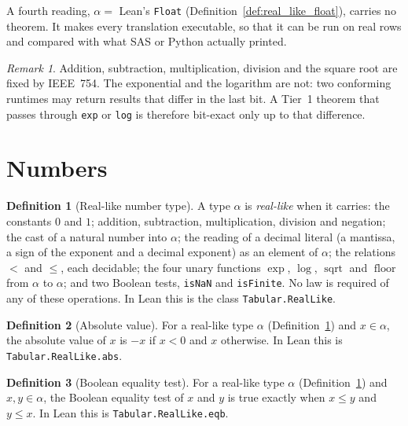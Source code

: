 \documentclass[11pt,a4paper]{article}
\theoremstyle{definition}
\newtheorem{definition}{Definition}
\theoremstyle{plain}
\theoremstyle{remark}
\newtheorem{remark}{Remark}
\newcommand{\code}[1]{\texttt{#1}}
\begin{document}
A fourth reading, $\alpha = $ Lean's \code{Float} (Definition~\ref{def:real_like_float}),
carries no theorem. It makes every translation executable, so that it can be run on real rows
and compared with what SAS or Python actually printed.

\begin{remark}\label{rem:primitives}
Addition, subtraction, multiplication, division and the square root are fixed by IEEE~754.
The exponential and the logarithm are not: two conforming runtimes may return results that
differ in the last bit. A Tier~1 theorem that passes through \code{exp} or \code{log} is
therefore bit-exact only up to that difference.
\end{remark}

\section{Numbers}

\begin{definition}[Real-like number type]\label{def:real_like}
A type $\alpha$ is \emph{real-like} when it carries: the constants $0$ and $1$; addition,
subtraction, multiplication, division and negation; the cast of a natural number into
$\alpha$; the reading of a decimal literal (a mantissa, a sign of the exponent and a decimal
exponent) as an element of $\alpha$; the relations $<$ and $\le$, each decidable; the four
unary functions $\exp$, $\log$, $\operatorname{sqrt}$ and $\operatorname{floor}$ from $\alpha$
to $\alpha$; and two Boolean tests, \code{isNaN} and \code{isFinite}. No law is required of any
of these operations. In Lean this is the class \code{Tabular.RealLike}.
\end{definition}

\begin{definition}[Absolute value]\label{def:abs}
For a real-like type $\alpha$ (Definition~\ref{def:real_like}) and $x \in \alpha$, the
absolute value of $x$ is $-x$ if $x < 0$ and $x$ otherwise. In Lean this is
\code{Tabular.RealLike.abs}.
\end{definition}

\begin{definition}[Boolean equality test]\label{def:eqb}
For a real-like type $\alpha$ (Definition~\ref{def:real_like}) and $x, y \in \alpha$, the
Boolean equality test of $x$ and $y$ is true exactly when $x \le y$ and $y \le x$. In Lean this
is \code{Tabular.RealLike.eqb}.
\end{definition}
\end{document}
